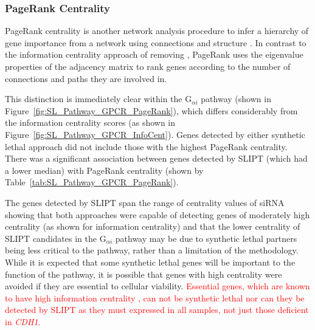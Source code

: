 \FloatBarrier

\subsubsection{PageRank Centrality}  \label{chapt4:Network_PageRank}

\FloatBarrier

\gls{PageRank centrality} is another network analysis procedure to infer a hierarchy of gene importance from a network using connections and structure \citep{Brin1998}. In contrast to the \gls{information centrality} approach of removing , PageRank uses the eigenvalue properties of the adjacency matrix to rank genes according to the number of connections and paths they are involved in. 

This distinction is immediately clear within the G$_{\alpha i}$ \gls{pathway} (shown in Figure~\ref{fig:SL_Pathway_GPCR_PageRank}), which differs considerably from the \gls{information centrality} scores (as shown in Figure~\ref{fig:SL_Pathway_GPCR_InfoCent}). 
Genes detected by either \gls{synthetic lethal} approach did not include those with the highest PageRank centrality. There was a significant association between genes detected by \gls{SLIPT} (which had a lower median) with PageRank \gls{centrality} (shown by Table~\ref{tab:SL_Pathway_GPCR_PageRank}).

The genes detected by \gls{SLIPT} span the range of \gls{centrality} values of \gls{siRNA} showing that both approaches were capable of detecting genes of moderately high \gls{centrality} (as shown for information centrality) and that the lower \gls{centrality} of \gls{SLIPT} candidates in the G$_{\alpha i}$ \gls{pathway} may be due to \gls{synthetic lethal} partners being less critical to the \gls{pathway}, rather than a limitation of the methodology. While it is expected that some \gls{synthetic lethal} genes will be important to the function of the \gls{pathway}, it is possible that genes with high \gls{centrality} were avoided if they are \gls{essential} to cellular viability. \textcolor{red}{Essential genes, which are known to have high information centrality \citep{Kranthi2013}, can not be synthetic lethal nor can they be detected by SLIPT as they must expressed in all samples, not just those deficient in \textit{CDH1}.}  


